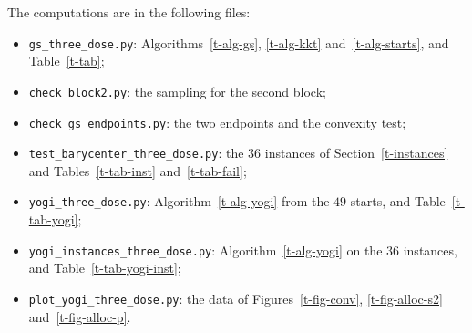 \documentclass[11pt]{article}
\theoremstyle{plain}
\theoremstyle{remark}
\numberwithin{equation}{section}
\begin{document}
The computations are in the following files:
\begin{itemize}
\item \texttt{gs\_three\_dose.py}: Algorithms~\ref{t-alg-gs}, \ref{t-alg-kkt}
and~\ref{t-alg-starts}, and Table~\ref{t-tab};
\item \texttt{check\_block2.py}: the sampling for the second block;
\item \texttt{check\_gs\_endpoints.py}: the two endpoints and the convexity test;
\item \texttt{test\_barycenter\_three\_dose.py}: the $36$ instances of
Section~\ref{t-instances} and Tables~\ref{t-tab-inst} and~\ref{t-tab-fail};
\item \texttt{yogi\_three\_dose.py}: Algorithm~\ref{t-alg-yogi} from the $49$
starts, and Table~\ref{t-tab-yogi};
\item \texttt{yogi\_instances\_three\_dose.py}: Algorithm~\ref{t-alg-yogi} on
the $36$ instances, and Table~\ref{t-tab-yogi-inst};
\item \texttt{plot\_yogi\_three\_dose.py}: the data of
Figures~\ref{t-fig-conv}, \ref{t-fig-alloc-s2} and~\ref{t-fig-alloc-p}.
\end{itemize}



\end{document}
